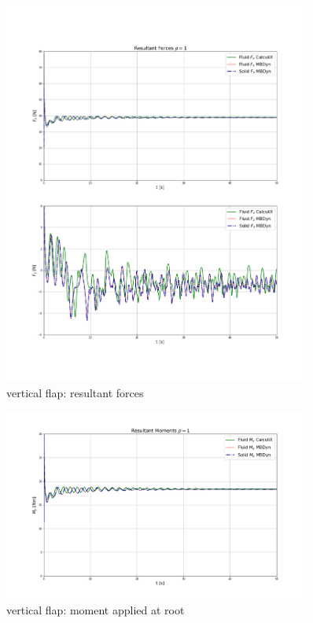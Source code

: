 \begin{figure}[htbp!]
	\centering
	\includegraphics[width=0.9\textwidth]{images/vert_flap/forces_rho1.png}
	\caption{vertical flap: resultant forces}
	\label{fig:vf_force}
\end{figure}

\begin{figure}[htbp!]
	\centering
	\includegraphics[width=0.9\textwidth]{images/vert_flap/moments_rho1.png}
	\caption{vertical flap: moment applied at root}
	\label{fig:vf_moment}
\end{figure}



